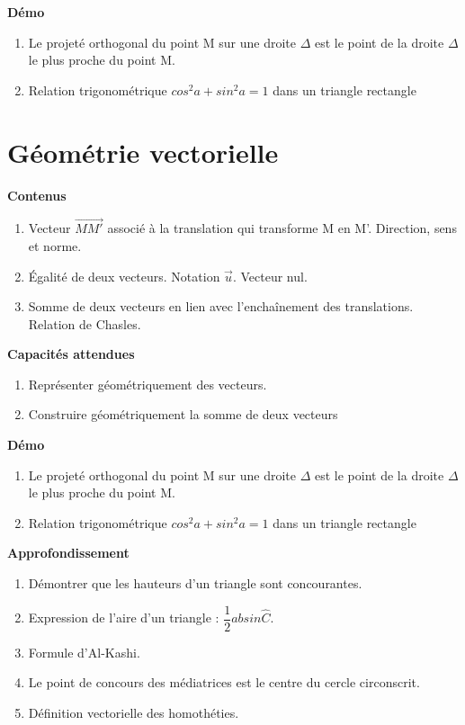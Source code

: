 \documentclass[10pt,a4paper]{article}
\begin{document}
\textbf{Démo}
 
\begin{enumerate}
\item Le projeté orthogonal du point M sur une droite $\Delta$ est le point de la droite $\Delta$ le plus proche du point M.
\item Relation trigonométrique $cos^2a + sin^2 a = 1$ dans un triangle rectangle
\end{enumerate}


\section{Géométrie vectorielle}

\textbf{Contenus}

\begin{enumerate}
\item  Vecteur $\overrightarrow{MM'}$ associé à la translation qui transforme M en M'. Direction, sens et norme.
\item  Égalité de deux vecteurs. Notation $\vec{u}$. Vecteur nul.
\item  Somme de deux vecteurs en lien avec l'enchaînement des translations. Relation de Chasles.
\end{enumerate}

\textbf{Capacités attendues}
 
\begin{enumerate}
\item Représenter géométriquement des vecteurs.
\item Construire géométriquement la somme de deux vecteurs
\end{enumerate}

\textbf{Démo}
 
\begin{enumerate}
\item Le projeté orthogonal du point M sur une droite $\Delta$ est le point de la droite $\Delta$ le plus proche du point M.
\item Relation trigonométrique $cos^2a + sin^2 a = 1$ dans un triangle rectangle
\end{enumerate}



\textbf{Approfondissement}

\begin{enumerate}
\item Démontrer que les hauteurs d’un triangle sont concourantes.
\item Expression de l’aire d’un triangle : $\dfrac12 ab sin\widehat C$.
\item Formule d’Al-Kashi.
\item Le point de concours des médiatrices est le centre du cercle circonscrit.
\item Définition vectorielle des homothéties.
\end{enumerate}
\end{document}
